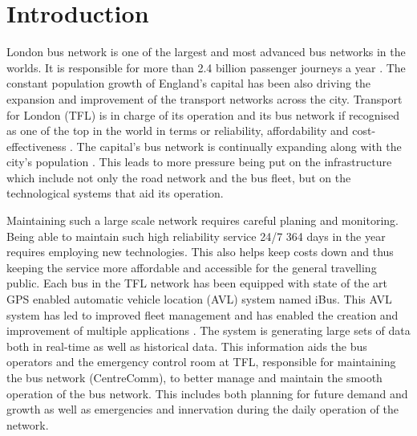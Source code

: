 \chapter{Introduction}
London bus network is one of the largest and most advanced bus networks in the worlds. It is responsible for more than 2.4 billion passenger journeys a year \cite{TFL1}. The constant population growth of England's capital has been also driving the expansion and improvement of the transport networks across the city. Transport for London (TFL) is in charge of its operation and its bus network if recognised as one of the top in the world in terms or reliability, affordability and cost-effectiveness \cite{TFL1}. The capital's bus network is continually expanding along with the city's population \cite{TFL2}. This leads to more pressure being put on the infrastructure which include not only the road network and the bus fleet, but on the technological systems that aid its operation.

Maintaining such a large scale network requires careful planing and monitoring. Being able to maintain such high reliability service 24/7 364 days in the year requires employing new technologies. This also helps keep costs down and thus keeping the service more affordable and accessible for the general travelling public. Each bus in the TFL network has been equipped with state of the art GPS enabled automatic vehicle location (AVL) system named iBus\cite{ibusdeployment}. This AVL system has led to improved fleet management and has enabled the creation and improvement of multiple applications \cite{eps354267}. The system is generating large sets of data both in real-time as well as historical data. This information aids the bus operators and the emergency control room at TFL, responsible for maintaining the bus network (CentreComm), to better manage and maintain the smooth operation of the bus network. This includes both planning for future demand and growth as well as emergencies and innervation during the daily operation of the network. 

